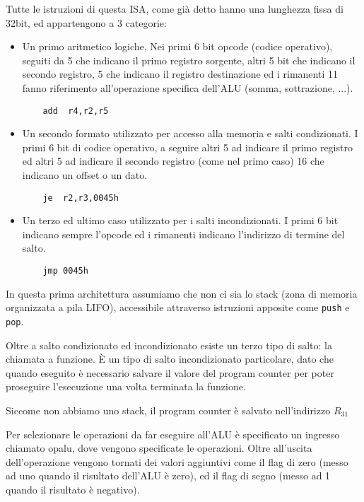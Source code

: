 \documentclass[../ace.tex]{subfiles}
\begin{document}
Tutte le istruzioni di questa ISA, come già detto hanno una lunghezza fissa di 32bit, ed appartengono a
3 categorie:
\begin{itemize}
    \item Un primo aritmetico logiche,
        Nei primi 6 bit opcode (codice operativo),
        seguiti da 5 che indicano il primo registro sorgente,
        altri 5 bit che indicano il secondo registro,
        5 che indicano il registro destinazione
        ed i rimanenti 11 fanno riferimento all'operazione specifica dell'ALU (somma, sottrazione, ...).
        \begin{lstlisting}
    add  r4,r2,r5
    \end{lstlisting}

    \item Un secondo formato utilizzato per accesso alla memoria e salti condizionati.
        I primi 6 bit di codice operativo,
        a seguire altri 5 ad indicare il primo registro
        ed altri 5 ad indicare il secondo registro (come nel primo caso)
        16 che indicano un offset o un dato.

        \begin{lstlisting}
    je  r2,r3,0045h
        \end{lstlisting}
    \item Un terzo ed ultimo caso utilizzato per i salti incondizionati.
        I primi 6 bit indicano sempre l'opcode ed i rimanenti indicano l'indirizzo di termine del
        salto.

        \begin{lstlisting}
    jmp 0045h
        \end{lstlisting}
\end{itemize}
In questa prima architettura assumiamo che non ci sia lo stack (zona di memoria organizzata a pila LIFO),
accessibile attraverso istruzioni apposite come \lstinline{push} e \lstinline{pop}.

Oltre a salto condizionato ed incondizionato esiste un terzo tipo di salto: la chiamata a funzione.
È un tipo di salto incondizionato particolare, dato che quando eseguito è necessario salvare il valore
del program counter per poter proseguire l'esecuzione una volta terminata la funzione.

Siccome non abbiamo uno stack, il program counter è salvato nell'indirizzo $R_{31}$

Per selezionare le operazioni da far eseguire all'ALU è specificato un ingresso chiamato opalu, dove vengono
specificate le operazioni. Oltre all'uscita dell'operazione vengono tornati dei valori aggiuntivi come
il flag di zero (messo ad uno quando il risultato dell'ALU è zero), ed il flag di segno (messo ad 1 quando il
risultato è negativo).
\end{document}
